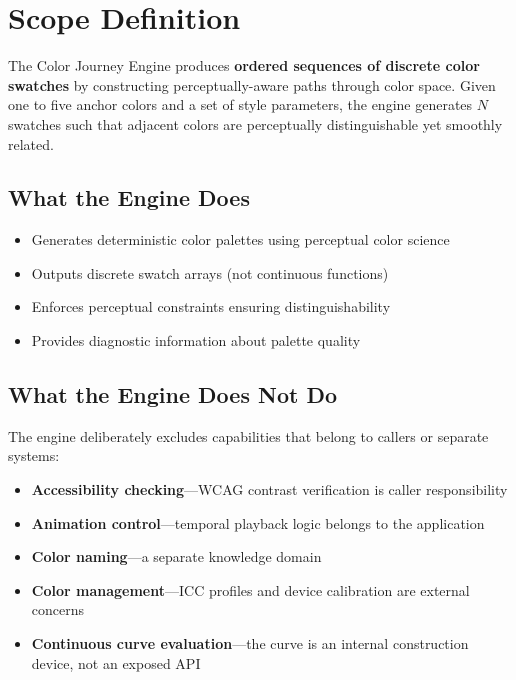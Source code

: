 \section{Scope Definition}
\label{sec:scope}

The Color Journey Engine produces \textbf{ordered sequences of discrete color swatches} by constructing perceptually-aware paths through color space. Given one to five anchor colors and a set of style parameters, the engine generates $N$ swatches such that adjacent colors are perceptually distinguishable yet smoothly related.

\subsection*{What the Engine Does}

\begin{itemize}
    \item Generates deterministic color palettes using perceptual color science
    \item Outputs discrete swatch arrays (not continuous functions)
    \item Enforces perceptual constraints ensuring distinguishability
    \item Provides diagnostic information about palette quality
\end{itemize}

\subsection*{What the Engine Does Not Do}

The engine deliberately excludes capabilities that belong to callers or separate systems:

\begin{itemize}
    \item \textbf{Accessibility checking}---WCAG contrast verification is caller responsibility
    \item \textbf{Animation control}---temporal playback logic belongs to the application
    \item \textbf{Color naming}---a separate knowledge domain
    \item \textbf{Color management}---ICC profiles and device calibration are external concerns
    \item \textbf{Continuous curve evaluation}---the curve is an internal construction device, not an exposed API
\end{itemize}

